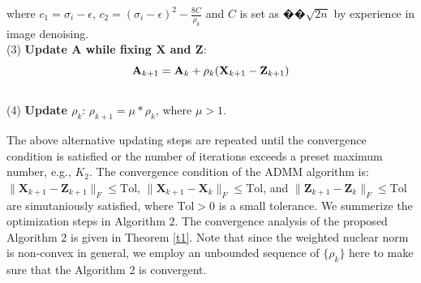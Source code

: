 \documentclass[10pt,twocolumn,letterpaper,sort&compress]{article}
\begin{document}
where $c_{1}=\sigma_{i}-\epsilon$, $c_{2} = (\sigma_{i}-\epsilon)^{2}-\frac{8C}{\rho_{k}}$ and $C$ is set as $��
\sqrt{2n}$ by experience in image denoising.
 \\
(3) \textbf{Update $\mathbf{A}$ while fixing $\mathbf{X}$ and $\mathbf{Z}$}:
\vspace{-1mm}
\begin{equation}
\label{e18}
\vspace{-3mm}
\mathbf{A}_{k+1}
=
\mathbf{A}_{k} + \rho_{k}(\mathbf{X}_{k+1}-\mathbf{Z}_{k+1})
\end{equation}
\\
(4) \textbf{Update $\rho_{k}$}: $\rho_{k+1}= \mu * \rho_{k}$, where $\mu>1$.

The above alternative updating steps are repeated until the convergence condition is satisfied or the number of iterations exceeds a preset maximum number, e.g., $K_{2}$. The convergence condition of the ADMM algorithm is: $\|\mathbf{X}_{k+1}-\mathbf{Z}_{k+1}\|_{F}\le \text{Tol}$, $\|\mathbf{X}_{k+1}-\mathbf{X}_{k}\|_{F}\le \text{Tol}$, and $\|\mathbf{Z}_{k+1}-\mathbf{Z}_{k}\|_{F}\le \text{Tol}$ are simutaniously satisfied, where $\text{Tol}>0$ is a small tolerance. We summerize the optimization steps in Algorithm 2. The convergence analysis of the proposed Algorithm 2 is given in Theorem \ref{t1}. Note that since the weighted nuclear norm is non-convex in general, we employ an unbounded sequence of $\{\rho_{k}\}$ here to make sure that the Algorithm 2 is convergent. 
\end{document}
